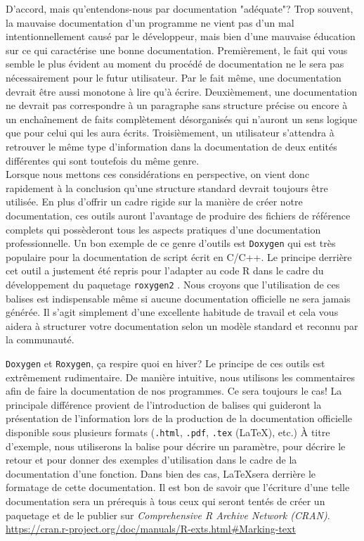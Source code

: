 D'accord, mais qu'entendons-nous par documentation "adéquate"? Trop souvent, la mauvaise documentation d'un programme ne vient pas d'un mal intentionnellement causé par le développeur, mais bien d'une mauvaise éducation sur ce qui caractérise une bonne documentation. Premièrement, le fait qui vous semble le plus évident au moment du procédé de documentation ne le sera pas nécessairement pour le futur utilisateur.  Par le fait même, une documentation devrait être aussi monotone à lire qu'à écrire. Deuxièmement, une documentation ne devrait pas correspondre à un paragraphe sans structure précise ou encore à un enchaînement de faits complètement désorganisés qui n'auront un sens logique que pour celui qui les aura écrits. Troisièmement, un utilisateur s'attendra à retrouver le même type d'information dans la documentation de deux entités différentes qui sont toutefois du même genre. \\

Lorsque nous mettons ces considérations en perspective, on vient donc rapidement à la conclusion qu'une structure standard devrait toujours être utilisée. En plus d'offrir un cadre rigide sur la manière de créer notre documentation, ces outils auront l'avantage de produire des fichiers de référence complets qui possèderont tous les aspects pratiques d'une documentation professionnelle. Un bon exemple de ce genre d'outils est \texttt{Doxygen} \cite{doxygen} qui est très populaire pour la documentation de script écrit en C/C++. Le principe derrière cet outil a justement été repris pour l'adapter au code R dans le cadre du développement du paquetage \texttt{roxygen2} \cite{roxygen2}. Nous croyons que l'utilisation de ces balises est indispensable même si aucune documentation officielle ne sera jamais générée. Il s'agit simplement d'une excellente habitude de travail et cela vous aidera à structurer votre documentation selon un modèle standard et reconnu par la communauté.\\

\begin{moreInfo}{\texttt{Doxygen} et \texttt{Roxygen}, ça respire quoi en hiver?}
	Le principe de ces outils est extrêmement rudimentaire. De manière intuitive, nous utilisons les commentaires afin de faire la documentation de nos programmes. Ce sera toujours le cas! La principale différence provient de l'introduction de balises qui guideront la présentation de l'information lors de la production de la documentation officielle disponible sous plusieurs formats (\texttt{.html}, \texttt{.pdf}, \texttt{.tex} (\LaTeX), etc.) À titre d'exemple, nous utiliserons la balise \@param pour décrire un paramètre, \@return pour décrire le retour et \@examples pour donner des exemples d'utilisation dans le cadre de la documentation d'une fonction. Dans bien des cas, \LaTeX  sera derrière le formatage de cette documentation. Il est bon de savoir que l'écriture d'une telle documentation sera un prérequis à tous ceux qui seront tentés de créer un paquetage et de le publier sur \emph{Comprehensive R Archive Network (CRAN)}. \\
	\url{https://cran.r-project.org/doc/manuals/R-exts.html#Marking-text}
\end{moreInfo}

